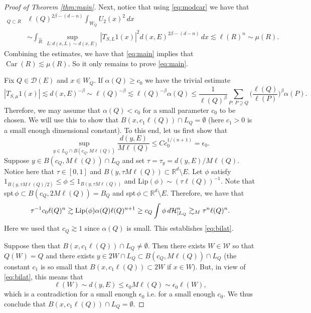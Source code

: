 \documentclass[11pt,a4paper,leqno]{amsart}
\newcommand{\R}{\mathbb{R}}
\numberwithin{equation}{section}
\newcommand{\Car}[0]{\operatorname{Car}}%
\theoremstyle{plain}
\theoremstyle{definition}
\theoremstyle{remark}
\begin{document}
\begin{proof}[Proof of Theorem \ref{thm:main}]
Next, notice that using \eqref{eq:modcar} we have that
\begin{align*}
\mathop{\sum_{Q\in\mathcal{D}(E)}}_{Q \subset R}& \ell(Q)^{2\beta-(d-n)} \int_{W_Q} U_2(x)^2\, dx \\
&\sim \int_{\widehat R}\,  \sup_{L\colon d(x,L) \sim d(x,E)} |T_{S,L}1(x)|^2 d(x, E)^{2\beta-(d-n)}\, dx  \lesssim \ell(R)^n \sim \mu(R).
\end{align*}
Combining the estimates, we have that \eqref{eq:main} implies that $\Car(R) \lesssim \mu(R)$. So it only remains to prove  \eqref{eq:main}.

Fix $Q \in \mathcal{D}(E)$ and $x \in W_Q$.
If $\alpha(Q) \ge c_0$ we have the trivial estimate
\begin{displaymath}
|T_{S,\mu}1(x)| \lesssim d(x, E)^{-\beta} \sim \ell(Q)^{-\beta} \lesssim \ell(Q)^{-\beta}\alpha(Q) \leq \frac{1}{\ell(Q)^{\beta}} \sum_{P:\,P \supseteq Q} \Big( \frac{\ell(Q)}{\ell(P)} \Big)^{\beta} \alpha(P).
\end{displaymath}
Therefore, we may assume that $\alpha(Q) < c_0$ for a small parameter $c_0$ to be chosen. We will use this to show that $B(x, c_1\ell(Q)) \cap L_Q = \emptyset$ (here $c_1>0$ is a small enough dimensional constant). To this end, let us first show that
\begin{equation}\label{eq:bilat}
\sup_{y\in L_Q\cap B(c_{Q},M\ell(Q))}\frac{d(y,E)}{M\ell(Q)} \le C c_0^{1/(n+1)} = \epsilon_0.
\end{equation}
Suppose $y\in B(c_{Q},M\ell(Q))\cap L_{Q}$ and set $\tau=\tau_y= d(y,E)/M \ell(Q)$. Notice here that $\tau \in [0,1]$ and $B(y,\tau M\ell(Q))\subset \R^{d} \setminus E$. Let $\phi$ satisfy
$1_{B(y,\tau M\ell(Q)/2)}\leq \phi\leq 1_{B(y,\tau M\ell(Q))}$ and Lip$(\phi) \sim (\tau \ell(Q))^{-1}$. Note that spt$\,\phi \subset B(c_{Q},2M\ell(Q)) = B_Q$ and spt$\,\phi \subset \R^{d} \setminus E$.
Therefore, we have that
\begin{align*}
\tau^{-1}c_0 \ell(Q)^n \gtrsim \textup{Lip}(\phi) \alpha(Q) \ell(Q)^{n+1} \ge c_Q \int \phi\, d\mathcal{H}^n_{\mid L_Q} \gtrsim_M \tau^n \ell(Q)^n.
\end{align*}
Here we used that $c_Q \gtrsim 1$ since $\alpha(Q)$ is small.
This establishes \eqref{eq:bilat}.

Suppose then that $B(x, c_1\ell(Q)) \cap L_Q \ne \emptyset$. Then there exists $W \in \mathcal{W}$ so that $Q(W) = Q$ and there exists $y \in 2W \cap L_Q \subset B(c_Q, M\ell(Q)) \cap L_Q$ (the constant $c_1$ is so small that  $B (x, c_1 \ell(Q)) \subset 2W$ if $x \in W$).
But, in view of \eqref{eq:bilat}, this means that
\begin{displaymath}
\ell(W) \sim d(y,E) \leq \epsilon_0 M \ell(Q) \sim \epsilon_0\ell(W),
\end{displaymath}
which is a contradiction for a small enough $\epsilon_0$ i.e. for a small enough $c_0$. We thus conclude that $B(x, c_1\ell(Q)) \cap L_Q = \emptyset$.


\end{proof}
\end{document}
